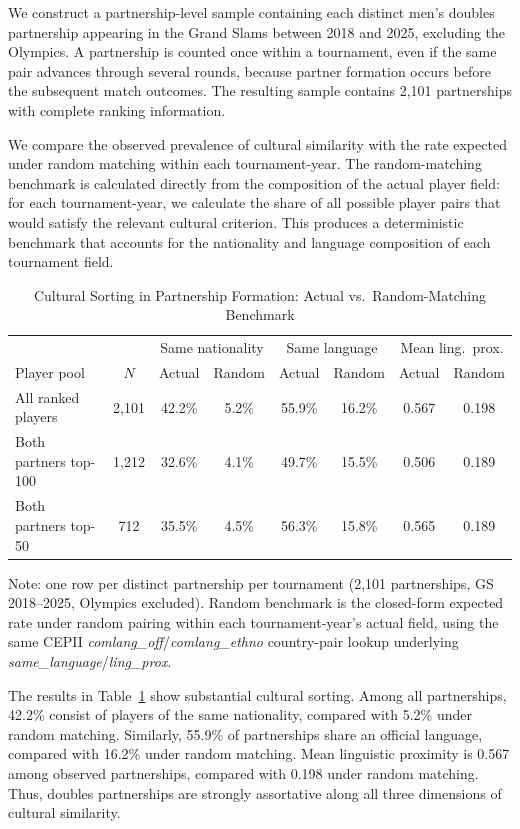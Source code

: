 \documentclass[10pt]{article}
\begin{document}
We construct a partnership-level sample containing each distinct men's doubles partnership appearing in the Grand Slams between 2018 and 2025, excluding the Olympics. A partnership is counted once within a tournament, even if the same pair advances through several rounds, because partner formation occurs before the subsequent match outcomes. The resulting sample contains 2,101 partnerships with complete ranking information.

We compare the observed prevalence of cultural similarity with the rate expected under random matching within each tournament-year. The random-matching benchmark is calculated directly from the composition of the actual player field: for each tournament-year, we calculate the share of all possible player pairs that would satisfy the relevant cultural criterion. This produces a deterministic benchmark that accounts for the nationality and language composition of each tournament field.

\begin{table}[htbp]
\color{blue}
\centering
\caption{Cultural Sorting in Partnership Formation: Actual vs.\ Random-Matching Benchmark \label{tab:t7}}
\begin{threeparttable}
\begin{tabular}{lccccccc}
\toprule
 & & \multicolumn{2}{c}{Same nationality} & \multicolumn{2}{c}{Same language} & \multicolumn{2}{c}{Mean ling.\ prox.} \\
Player pool & $N$ & Actual & Random & Actual & Random & Actual & Random \\
\midrule
All ranked players & 2,101 & 42.2\% & 5.2\% & 55.9\% & 16.2\% & 0.567 & 0.198 \\
Both partners top-100 & 1,212 & 32.6\% & 4.1\% & 49.7\% & 15.5\% & 0.506 & 0.189 \\
Both partners top-50 & 712 & 35.5\% & 4.5\% & 56.3\% & 15.8\% & 0.565 & 0.189 \\
\bottomrule
\end{tabular}
\begin{tablenotes}
\small
\item Note: one row per distinct partnership per tournament (2,101 partnerships, GS 2018--2025, Olympics excluded). Random benchmark is the closed-form expected rate under random pairing within each tournament-year's actual field, using the same CEPII \textit{comlang\_off}/\textit{comlang\_ethno} country-pair lookup underlying \textit{same\_language}/\textit{ling\_prox}.
\end{tablenotes}
\end{threeparttable}
\end{table}
\FloatBarrier
The results in Table~\ref{tab:t7} show substantial cultural sorting. Among all partnerships, 42.2\% consist of players of the same nationality, compared with 5.2\% under random matching. Similarly, 55.9\% of partnerships share an official language, compared with 16.2\% under random matching. Mean linguistic proximity is 0.567 among observed partnerships, compared with 0.198 under random matching. Thus, doubles partnerships are strongly assortative along all three dimensions of cultural similarity.
\end{document}
